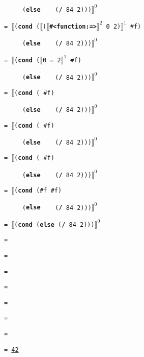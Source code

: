 \begin{minipage}{.8\linewidth}
	\quad\texttt{\ \ \ \ \ (\textbf{else}\ \ \ \ (\textbf{/} 84 2)))}$\rrbracket^0$

	\texttt{= }$\llbracket$\texttt{(\textbf{cond} (}$\llbracket$\texttt{(}$\llbracket$\texttt{\textbf{\#<function:=>}}$\rrbracket^2$\texttt{ 0 2)}$\rrbracket^1$\texttt{\ \#f)}\hfill{}

	\quad\texttt{\ \ \ \ \ (\textbf{else}\ \ \ \ (\textbf{/} 84 2)))}$\rrbracket^0$

	\texttt{= }$\llbracket$\texttt{(\textbf{cond} (}$\llbracket$\texttt{0 = 2}$\rrbracket^1$\texttt{\ \#f)}\hfill{}

	\quad\texttt{\ \ \ \ \ (\textbf{else}\ \ \ \ (\textbf{/} 84 2)))}$\rrbracket^0$

	\texttt{= }$\llbracket$\texttt{(\textbf{cond} (\ \#f)}\hfill{}

	\quad\texttt{\ \ \ \ \ (\textbf{else}\ \ \ \ (\textbf{/} 84 2)))}$\rrbracket^0$

	\texttt{= }$\llbracket$\texttt{(\textbf{cond} (\ \#f)}\hfill{}

	\quad\texttt{\ \ \ \ \ (\textbf{else}\ \ \ \ (\textbf{/} 84 2)))}$\rrbracket^0$

	\texttt{= }$\llbracket$\texttt{(\textbf{cond} (\ \#f)}\hfill{}

	\quad\texttt{\ \ \ \ \ (\textbf{else}\ \ \ \ (\textbf{/} 84 2)))}$\rrbracket^0$

	\texttt{= }$\llbracket$\texttt{(\textbf{cond} (\#f\ \#f)}\hfill{}

	\quad\texttt{\ \ \ \ \ (\textbf{else}\ \ \ \ (\textbf{/} 84 2)))}$\rrbracket^0$

	\texttt{= }$\llbracket$\texttt{(\textbf{cond} (\textbf{else} (\textbf{/} 84 2)))}$\rrbracket^0$\hfill{}

	\texttt{= }\hfill{}

	\texttt{= }\hfill{}

	\texttt{= }\hfill{}

	\texttt{= }\hfill{}

	\texttt{= }\hfill{}

	\texttt{= }\hfill{}

	\texttt{= }\hfill{}

	\texttt{= \underline{42}}
\end{minipage}



